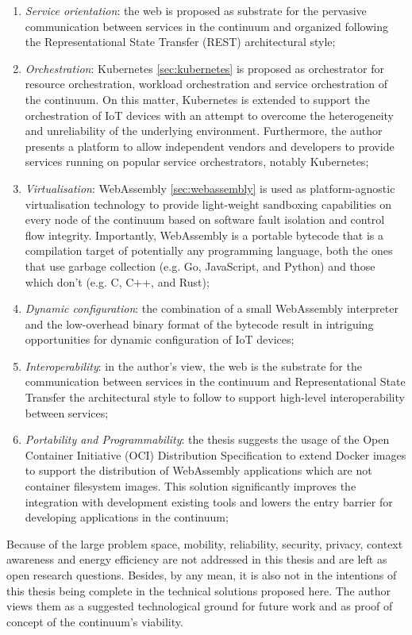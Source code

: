 \documentclass{ieeeaccess}
\begin{document}
\begin{enumerate}
    \item \emph{Service orientation}: the web is proposed as substrate for the pervasive communication between services in the continuum and organized following the Representational State Transfer (REST) architectural style;
    \item \emph{Orchestration}: Kubernetes \ref{sec:kubernetes} is proposed as orchestrator for resource orchestration, workload orchestration and service orchestration of the continuum. On this matter, Kubernetes is extended to support the orchestration of IoT devices with an attempt to overcome the heterogeneity and unreliability of the underlying environment. Furthermore, the author presents a platform to allow independent vendors and developers to provide services running on popular service orchestrators, notably Kubernetes;
    \item \emph{Virtualisation}: WebAssembly \ref{sec:webassembly} is used as platform-agnostic virtualisation technology to provide light-weight sandboxing capabilities on every node of the continuum based on software fault isolation and control flow integrity. Importantly, WebAssembly is a portable bytecode that is a compilation target of potentially any programming language, both the ones that use garbage collection (e.g. Go, JavaScript, and Python) and those which don't (e.g. C, C++, and Rust);
    \item \emph{Dynamic configuration}: the combination of a small WebAssembly interpreter and the low-overhead binary format of the bytecode result in intriguing opportunities for dynamic configuration of IoT devices;
    \item \emph{Interoperability}: in the author's view, the web is the substrate for the communication between services in the continuum and Representational State Transfer the architectural style to follow to support high-level interoperability between services;
    \item \emph{Portability and Programmability}: the thesis suggests the usage of the Open Container Initiative (OCI) Distribution Specification to extend Docker images to support the distribution of WebAssembly applications which are not container filesystem images. This solution significantly improves the integration with development existing tools and lowers the entry barrier for developing applications in the continuum;
\end{enumerate}

Because of the large problem space, mobility, reliability, security, privacy, context awareness and energy efficiency are not addressed in this thesis and are left as open research questions. Besides, by any mean, it is also not in the intentions of this thesis being complete in the technical solutions proposed here. The author views them as a suggested technological ground for future work and as proof of concept of the continuum's viability.
\end{document}
